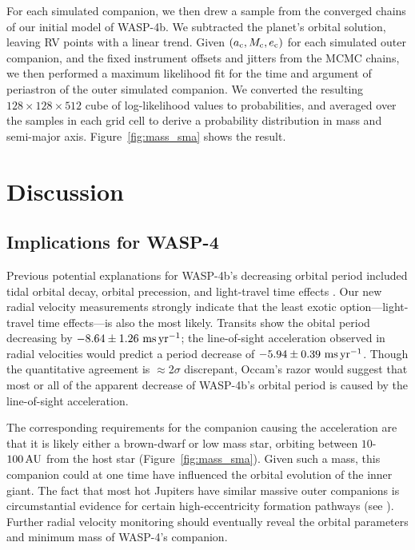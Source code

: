 \documentclass[12pt,twocolumn,tighten]{aastex62}
\begin{document}
For each simulated companion, we then drew a sample from the converged
chains of our initial model of WASP-4b. We subtracted the planet's
orbital solution, leaving RV points with a linear trend.  Given
$(a_{\rm c}, M_{\rm c}, e_{\rm c})$ for each simulated outer
companion, and the fixed instrument offsets and jitters from the MCMC
chains, we then performed a maximum likelihood fit for the time and
argument of periastron of the outer simulated companion.  We converted
the resulting $128\times128\times512$ cube of log-likelihood values to
probabilities, and averaged over the samples in each grid cell to
derive a probability distribution in mass and semi-major axis.
Figure~\ref{fig:mass_sma} shows the result.



\section{Discussion}
\label{sec:discussion}

\subsection{Implications for WASP-4}
Previous potential explanations for WASP-4b's decreasing orbital
period included tidal orbital decay, orbital precession, and
light-travel time effects \citep{bouma_wasp4b_2019}.  Our new radial
velocity measurements strongly indicate that the least exotic
option---light-travel time effects---is also the most likely.
Transits show the obital period decreasing by $- 8.64 \pm 1.26~{\rm
ms}\,{\rm yr}^{-1}$; the line-of-sight acceleration observed in radial
velocities would predict a period decrease of $-5.94 \pm 0.39~{\rm
ms}\,{\rm yr}^{-1}$.  Though the quantitative agreement is $\approx$2$\sigma$
discrepant, Occam's razor would suggest that most or all of the apparent
decrease of WASP-4b's orbital period is caused by the line-of-sight
acceleration.

The corresponding requirements for the companion causing the
acceleration are that it is likely either a brown-dwarf or low mass
star, orbiting between $10$-$100\,{\rm AU}$ from the host star
(Figure~\ref{fig:mass_sma}).  Given such a mass, this companion could
at one time have influenced the orbital evolution of the inner giant.
The fact that most hot Jupiters have similar massive outer companions
\citep{knutson_friends_2014,bryan_statistics_2016} is circumstantial
evidence for certain high-eccentricity formation pathways (see
\citealt{dawson_johnson_2018}).  Further radial velocity monitoring
should eventually reveal the orbital parameters and minimum mass of
WASP-4's companion.
\end{document}
